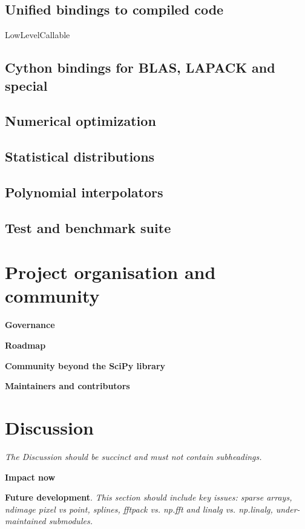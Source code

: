 \documentclass[fleqn,10pt]{wlscirep}
\begin{document}
\subsection*{Unified bindings to compiled code}
LowLevelCallable

\subsection*{Cython bindings for BLAS, LAPACK and special}

\subsection*{Numerical optimization}


\subsection*{Statistical distributions}

\subsection*{Polynomial interpolators}

\subsection*{Test and benchmark suite}


\section*{Project organisation and community}

\textbf{Governance}

\textbf{Roadmap}

\textbf{Community beyond the SciPy library}

\textbf{Maintainers and contributors}


\section*{Discussion}

\textit{The Discussion should be succinct and must not contain subheadings.}

\textbf{Impact now}

\textbf{Future development}.
\textit{This section should include key issues: sparse arrays, ndimage pixel vs point, splines, fftpack vs. np.fft and linalg vs. np.linalg, under-maintained submodules.}
\end{document}
